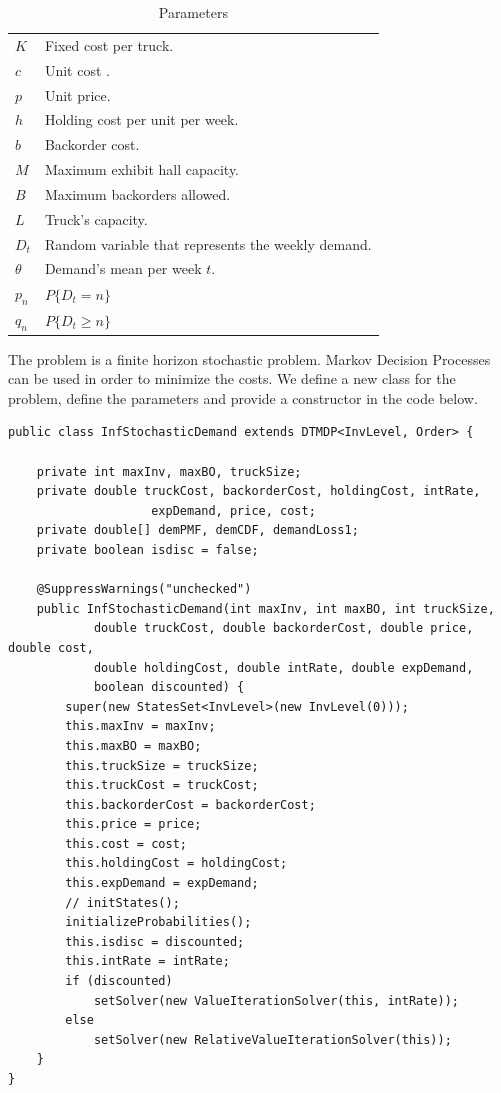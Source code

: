 \documentclass[11pt]{article}
\begin{document}
\begin{table}[ht]
\begin{center}
\begin{tabular}{ll}
$K$ & Fixed cost per truck.\\
$c$ & Unit cost .\\
$p$ & Unit price.\\
$h$ & Holding cost per unit per week.\\
$b$ & Backorder cost.\\
$M$ & Maximum exhibit hall capacity.\\
$B$ & Maximum backorders allowed.\\
$L$ & Truck's capacity.\\
$D_t$ & Random variable that represents the weekly demand.\\
$\theta$ & Demand's mean per week $t$.\\
$p_n$ & $P\{D_t = n\}$\\
$q_n$ & $P\{D_t \geq n\}$
\end{tabular}
\caption[\textbf{Parameters:}]{Parameters}
\label{tab:parameters3}
\end{center}
\end{table}

The problem is a finite horizon stochastic problem. Markov Decision Processes can be used in order to minimize the costs. We define a new class for the problem, define the parameters and provide a constructor in the code below. 
\begin{lstlisting}
public class InfStochasticDemand extends DTMDP<InvLevel, Order> {

    private int maxInv, maxBO, truckSize;
    private double truckCost, backorderCost, holdingCost, intRate, 
    				expDemand, price, cost;
    private double[] demPMF, demCDF, demandLoss1;
    private boolean isdisc = false;

    @SuppressWarnings("unchecked")
    public InfStochasticDemand(int maxInv, int maxBO, int truckSize,
            double truckCost, double backorderCost, double price, double cost,
            double holdingCost, double intRate, double expDemand,
            boolean discounted) {
        super(new StatesSet<InvLevel>(new InvLevel(0)));
        this.maxInv = maxInv;
        this.maxBO = maxBO;
        this.truckSize = truckSize;
        this.truckCost = truckCost;
        this.backorderCost = backorderCost;
        this.price = price;
        this.cost = cost;
        this.holdingCost = holdingCost;
        this.expDemand = expDemand;
        // initStates();
        initializeProbabilities();
        this.isdisc = discounted;
        this.intRate = intRate;
        if (discounted)
            setSolver(new ValueIterationSolver(this, intRate));
        else
            setSolver(new RelativeValueIterationSolver(this));
    }
}
\end{lstlisting}
\end{document}
